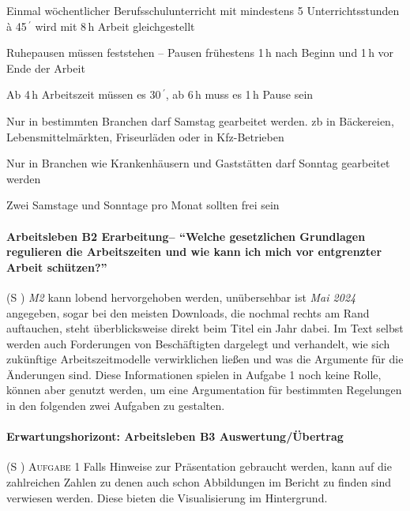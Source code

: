 \begin{myitemize}
\begin{myitemize}
        \item Einmal wöchentlicher Berufsschulunterricht mit mindestens 5 Unterrichtsstunden à 45$\,^{\prime}$ wird mit 8\,h Arbeit gleichgestellt
        \item Ruhepausen müssen feststehen -- Pausen frühestens 1\,h nach Beginn und 1\,h vor Ende der Arbeit
        \item Ab 4\,h Arbeitszeit müssen es 30$\,^{\prime}$, ab 6\,h muss es 1\,h Pause sein 
        \item Nur in bestimmten Branchen darf Samstag gearbeitet werden. \Gls{zb} in Bäckereien, Lebensmittelmärkten, Friseurläden oder in Kfz-Betrieben
        \item Nur in Branchen wie Krankenhäusern und Gaststätten darf Sonntag gearbeitet werden
        \item Zwei Samstage und Sonntage pro Monat sollten frei sein
    \end{myitemize}
\end{myitemize}


\paragraph{Arbeitsleben B2 Erarbeitung-- \enquote{Welche gesetzlichen Grundlagen regulieren die Arbeitszeiten und wie kann ich mich vor entgrenzter Arbeit schützen?}} (\gls{S} \pageref{ARBEITSLEBEN-B2})
\emph{M2} kann lobend hervorgehoben werden, unübersehbar ist \emph{Mai 2024} angegeben, sogar bei den meisten Downloads, die nochmal rechts am Rand auftauchen, steht überblicksweise direkt beim Titel ein Jahr dabei. Im Text selbst werden auch Forderungen von Beschäftigten dargelegt und verhandelt, wie sich zukünftige Arbeitszeitmodelle verwirklichen ließen und was die Argumente für die Änderungen sind. Diese Informationen spielen in Aufgabe 1 noch keine Rolle, können aber genutzt werden, um eine Argumentation für bestimmten Regelungen in den folgenden zwei Aufgaben zu gestalten. 



\paragraph{Erwartungshorizont: Arbeitsleben B3 Auswertung/Übertrag} (\gls{S} \pageref{ARBEITSLEBEN-B3})
\textsc{Aufgabe 1}  \quad 
Falls Hinweise zur Präsentation gebraucht werden, kann auf die zahlreichen Zahlen zu denen auch schon Abbildungen im Bericht zu finden sind verwiesen werden. Diese bieten die Visualisierung im Hintergrund. 


